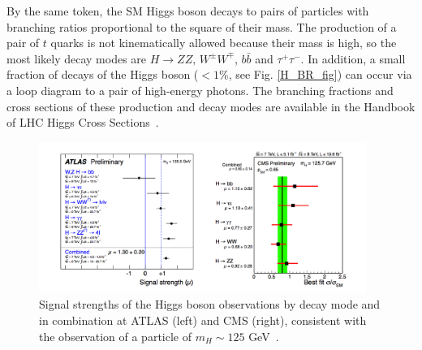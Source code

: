 \documentclass[10pt]{article}
\begin{document}
\newpage
By the same token, the SM Higgs boson decays to pairs of particles with branching ratios proportional to the square of their mass. The production of a pair of $t$ quarks is not kinematically allowed because their mass is high, so the most likely decay modes are $H \rightarrow ZZ \text{, } W^{\pm}W^{\mp}$, $ b\bar{b}$ and $ \tau^+ \tau^-$. In addition, a small fraction of decays of the Higgs boson ($<1\%$, see Fig. \ref{H_BR_fig}) can occur via a loop diagram to a pair of high-energy photons. The branching fractions and cross sections of these production and decay modes are available in the Handbook of LHC Higgs Cross Sections~\cite{H_XS1,H_XS2}.


\begin{figure}[h!]
\centering
\includegraphics[width=0.95\textwidth]{"SignalStrength"}
\caption{Signal strengths of the Higgs boson observations by decay mode and in combination at ATLAS (left) and CMS (right), consistent with the observation of a particle of $m_H \sim 125$ GeV~\cite{H_XS3}.}
\label{sig_strength}
\end{figure}
\end{document}
